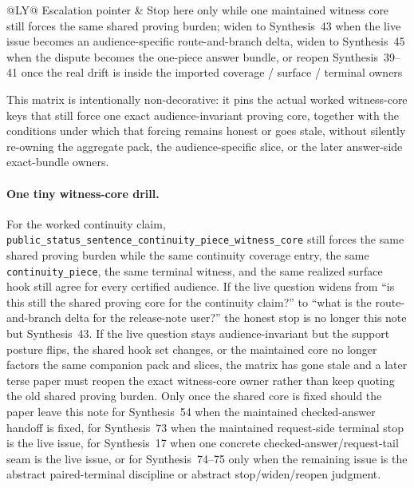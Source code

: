 \documentclass[11pt]{article}
\begin{document}
\begin{table}[t]
\begin{tabularx}{\linewidth}{@{}LY@{}}
Escalation pointer & Stop here only while one maintained witness core still forces the same shared proving burden; widen to Synthesis~43 when the live issue becomes an audience-specific route-and-branch delta, widen to Synthesis~45 when the dispute becomes the one-piece answer bundle, or reopen Synthesis~39--41 once the real drift is inside the imported coverage / surface / terminal owners \\
\bottomrule
\end{tabularx}
\caption{A forced public witness-core matrix. This is the smallest audience-invariant proving object later terse papers can quote directly when the live issue is whether one maintained core still forces the same shared proving burden rather than merely which core exists in the abstract.}
\label{tab:forced-public-witness-core-matrix}
\end{table}

This matrix is intentionally non-decorative: it pins the actual worked witness-core keys that still force one exact audience-invariant proving core, together with the conditions under which that forcing remains honest or goes stale, without silently re-owning the aggregate pack, the audience-specific slice, or the later answer-side exact-bundle owners.\cite{series:workedexample}

\paragraph{One tiny witness-core drill.}
For the worked continuity claim, \nolinkurl{public_status_sentence_continuity_piece_witness_core} still forces the same shared proving burden while the same continuity coverage entry, the same \nolinkurl{continuity_piece}, the same terminal witness, and the same realized surface hook still agree for every certified audience. If the live question widens from ``is this still the shared proving core for the continuity claim?'' to ``what is the route-and-branch delta for the release-note user?'' the honest stop is no longer this note but Synthesis~43. If the live question stays audience-invariant but the support posture flips, the shared hook set changes, or the maintained core no longer factors the same companion pack and slices, the matrix has gone stale and a later terse paper must reopen the exact witness-core owner rather than keep quoting the old shared proving burden. Only once the shared core is fixed should the paper leave this note for Synthesis~54 when the maintained checked-answer handoff is fixed, for Synthesis~73 when the maintained request-side terminal stop is the live issue, for Synthesis~17 when one concrete checked-answer/request-tail seam is the live issue, or for Synthesis~74--75 only when the remaining issue is the abstract paired-terminal discipline or abstract stop/widen/reopen judgment.\cite{series:workedexample}
\end{document}
